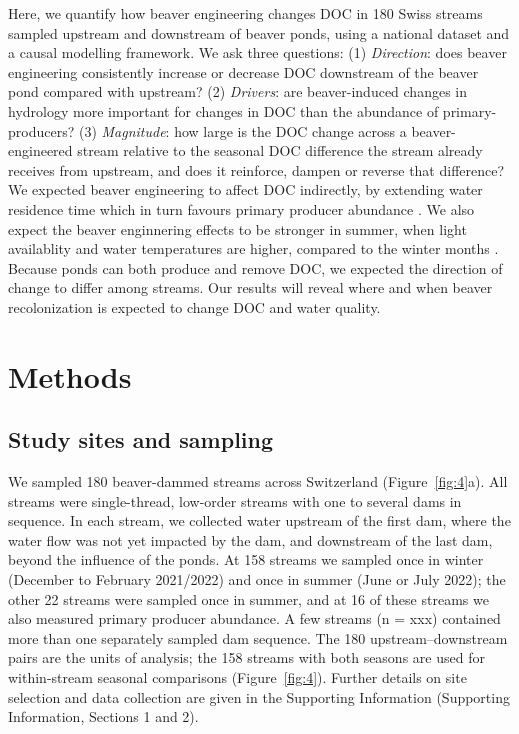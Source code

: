 \documentclass[pdflatex,sn-nature]{sn-jnl}   %
\begin{document}
Here, we quantify how beaver engineering changes DOC in 180 Swiss streams sampled upstream and downstream of beaver ponds, using a national dataset and a causal modelling framework. We ask three questions: (1) \emph{Direction}: does beaver engineering consistently increase or decrease DOC downstream of the beaver pond compared with upstream? (2) \emph{Drivers}: are beaver-induced changes in hydrology more important for  changes in DOC than the abundance of primary-producers? (3) \emph{Magnitude}: how large is the DOC change across a beaver-engineered stream relative to the seasonal DOC difference the stream already receives from upstream, and does it reinforce, dampen or reverse that difference? We expected beaver engineering to affect DOC indirectly, by extending water residence time which in turn favours primary producer abundance \cite{nummi2018,johnston2017}. We also expect the beaver enginnering effects to be stronger in summer, when light availablity and water temperatures are higher, compared to the winter months \cite{mulholland1997}. Because ponds can both produce and remove DOC, we expected the direction of change to differ among streams. Our results will reveal where and when beaver recolonization is expected to change DOC and water quality.

\section{Methods}

\subsection{Study sites and sampling}

We sampled 180 beaver-dammed streams across Switzerland (Figure~\ref{fig:4}a). All streams were single-thread, low-order streams with one to several dams in sequence. In each stream, we collected water upstream of the first dam, where the water flow was not yet impacted by the dam, and downstream of the last dam, beyond the influence of the ponds. At 158 streams we sampled once in winter (December to February 2021/2022) and once in summer (June or July 2022); the other 22 streams were sampled once in summer, and at 16 of these streams we also measured primary producer abundance. A few streams (n = xxx) contained more than one separately sampled dam sequence. The 180 upstream--downstream pairs are the units of analysis; the 158 streams with both seasons are used for within-stream seasonal comparisons (Figure~\ref{fig:4}). Further details on site selection and data collection are given in the Supporting Information (Supporting Information, Sections 1 and 2).
\end{document}
